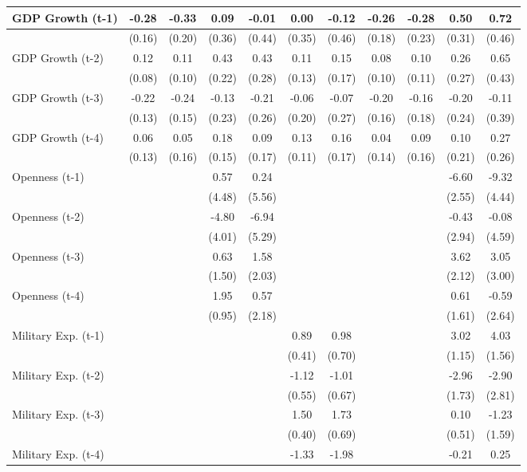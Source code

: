 \begin{tabular}{lcccccccccc}
\toprule
GDP Growth (t-1) & -0.28 & -0.33 & 0.09 & -0.01 & 0.00 & -0.12 & -0.26 & -0.28 & 0.50 & 0.72 \\
\midrule
& (0.16) & (0.20) & (0.36) & (0.44) & (0.35) & (0.46) & (0.18) & (0.23) & (0.31) & (0.46) \\
GDP Growth (t-2) & 0.12 & 0.11 & 0.43 & 0.43 & 0.11 & 0.15 & 0.08 & 0.10 & 0.26 & 0.65 \\
& (0.08) & (0.10) & (0.22) & (0.28) & (0.13) & (0.17) & (0.10) & (0.11) & (0.27) & (0.43) \\
GDP Growth (t-3) & -0.22 & -0.24 & -0.13 & -0.21 & -0.06 & -0.07 & -0.20 & -0.16 & -0.20 & -0.11 \\
& (0.13) & (0.15) & (0.23) & (0.26) & (0.20) & (0.27) & (0.16) & (0.18) & (0.24) & (0.39) \\
GDP Growth (t-4) & 0.06 & 0.05 & 0.18 & 0.09 & 0.13 & 0.16 & 0.04 & 0.09 & 0.10 & 0.27 \\
& (0.13) & (0.16) & (0.15) & (0.17) & (0.11) & (0.17) & (0.14) & (0.16) & (0.21) & (0.26) \\
Openness (t-1) &  &  & 0.57 & 0.24 &  &  &  &  & -6.60 & -9.32 \\
&  &  & (4.48) & (5.56) &  &  &  &  & (2.55) & (4.44) \\
Openness (t-2) &  &  & -4.80 & -6.94 &  &  &  &  & -0.43 & -0.08 \\
&  &  & (4.01) & (5.29) &  &  &  &  & (2.94) & (4.59) \\
Openness (t-3) &  &  & 0.63 & 1.58 &  &  &  &  & 3.62 & 3.05 \\
&  &  & (1.50) & (2.03) &  &  &  &  & (2.12) & (3.00) \\
Openness (t-4) &  &  & 1.95 & 0.57 &  &  &  &  & 0.61 & -0.59 \\
&  &  & (0.95) & (2.18) &  &  &  &  & (1.61) & (2.64) \\
Military Exp. (t-1) &  &  &  &  & 0.89 & 0.98 &  &  & 3.02 & 4.03 \\
&  &  &  &  & (0.41) & (0.70) &  &  & (1.15) & (1.56) \\
Military Exp. (t-2) &  &  &  &  & -1.12 & -1.01 &  &  & -2.96 & -2.90 \\
&  &  &  &  & (0.55) & (0.67) &  &  & (1.73) & (2.81) \\
Military Exp. (t-3) &  &  &  &  & 1.50 & 1.73 &  &  & 0.10 & -1.23 \\
&  &  &  &  & (0.40) & (0.69) &  &  & (0.51) & (1.59) \\
Military Exp. (t-4) &  &  &  &  & -1.33 & -1.98 &  &  & -0.21 & 0.25 \\

\end{tabular}

